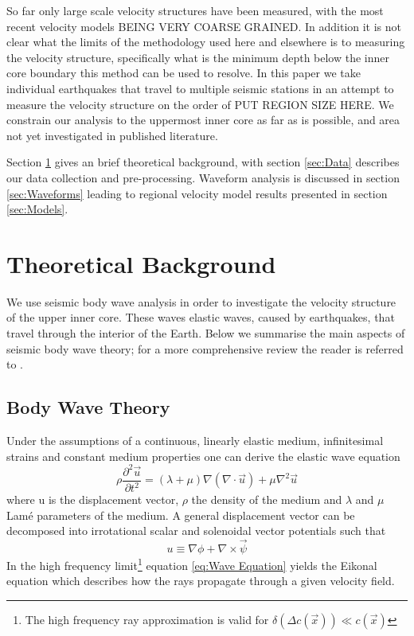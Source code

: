 \documentclass[11pt,a4paper]{article}
\begin{document}
So far only large scale velocity structures have been measured, with the most recent velocity models BEING VERY COARSE GRAINED. In addition it is not clear what the limits of the methodology used here and elsewhere is to measuring the velocity structure, specifically what is the minimum depth below the inner core boundary this method can be used to resolve. In this paper we take individual earthquakes that travel to multiple seismic stations in an attempt to measure the velocity structure on the order of PUT REGION SIZE HERE. We constrain our analysis to the uppermost inner core as far as is possible, and area not yet investigated in published literature.

Section \ref{sec:Theory} gives an brief theoretical background, with section \ref{sec:Data} describes our data collection and pre-processing. Waveform analysis is discussed in section \ref{sec:Waveforms} leading to regional velocity model results presented in section \ref{sec:Models}.

\section{Theoretical Background}
\label{sec:Theory}
We use seismic body wave analysis in order to investigate the velocity structure of the upper inner core. These waves elastic waves, caused by earthquakes, that travel through the interior of the Earth. Below we summarise the main aspects of seismic body wave theory; for a more comprehensive review the reader is referred to \cite{Shearer2009}.

\subsection{Body Wave Theory}
Under the assumptions of a continuous, linearly elastic medium, infinitesimal strains and constant medium properties one can derive the elastic wave equation
\begin{equation}
	\rho \frac{\partial^{2} \vec{u}}{\partial t^{2}} = \left ( \lambda + \mu \right ) \nabla \left ( \nabla \cdot \vec{u} \right ) + \mu \nabla^{2} \vec{u}
	\label{eq:Wave Equation}
\end{equation}
where u is the displacement vector, $\rho$ the density of the medium and $\lambda$ and $\mu$  Lam\'{e} parameters of the medium. A general displacement vector can be decomposed into irrotational scalar and solenoidal vector potentials such that
\begin{equation}
	u \equiv \nabla \phi + \nabla \times \vec{\psi}
	\label{eq:Displacement}
\end{equation}
In the high frequency limit\footnote{ The high frequency ray approximation is valid for $\delta \left ( \Delta c \left ( \vec{x} \right ) \right ) \ll c \left ( \vec{x} \right )$} equation \eqref{eq:Wave Equation} yields the Eikonal equation which describes how the rays propagate through a given velocity field.
\end{document}
